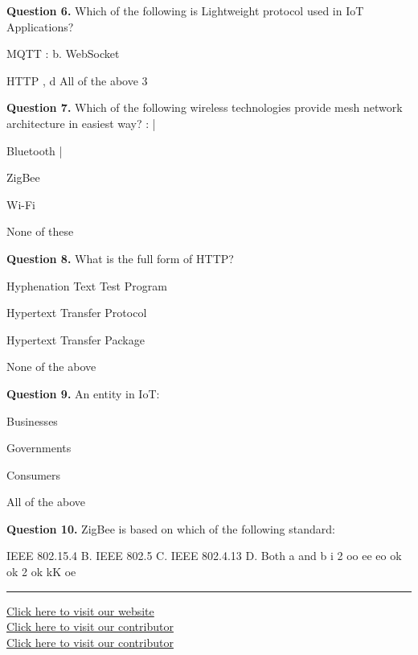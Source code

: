 \documentclass[11pt,a4paper]{article}
\begin{document}
\medskip\noindent\textbf{Question 6.} Which of the following is Lightweight protocol used in IoT Applications?
\begin{parts}
  \item MQTT
  : b. WebSocket
  \item HTTP ,
  d All of the above 3
\end{parts}

\medskip\noindent\textbf{Question 7.} Which of the following wireless technologies provide mesh network architecture in
easiest way? : |
\begin{parts}
  \item Bluetooth |
  \item ZigBee
  \item Wi-Fi
  \item None of these
\end{parts}

\medskip\noindent\textbf{Question 8.} What is the full form of HTTP?
\begin{parts}
  \item Hyphenation Text Test Program
  \item Hypertext Transfer Protocol
  \item Hypertext Transfer Package
  \item None of the above
\end{parts}

\medskip\noindent\textbf{Question 9.} An entity in IoT:
\begin{parts}
  \item Businesses
  \item Governments
  \item Consumers
  \item All of the above
\end{parts}

\medskip\noindent\textbf{Question 10.} ZigBee is based on which of the following standard:
\begin{parts}
  \item IEEE 802.15.4
  B. IEEE 802.5
  C. IEEE 802.4.13
  D. Both a and b
  i 2 oo ee eo ok ok 2 ok kK oe
\end{parts}

\vfill
\rule{\linewidth}{0.4pt}
\begin{center}\small
\href{https://bhu-exam.vercel.app/}{Click here to visit our website}\\[4pt]\href{https://me-aryan.vercel.app/}{Click here to visit our contributor}\\[4pt]\href{https://quashan-me.vercel.app/}{Click here to visit our contributor}
\end{center}
\end{document}

